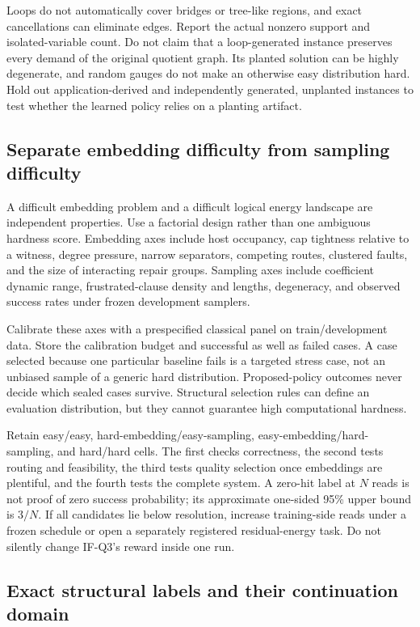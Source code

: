 \documentclass[11pt,a4paper]{article}
\theoremstyle{definition}\newtheorem{definition}[proposition]{Definition}
\begin{document}
Loops do not automatically cover bridges or tree-like regions, and exact cancellations can eliminate edges. Report the actual nonzero support and isolated-variable count. Do not claim that a loop-generated instance preserves every demand of the original quotient graph. Its planted solution can be highly degenerate, and random gauges do not make an otherwise easy distribution hard. Hold out application-derived and independently generated, unplanted instances to test whether the learned policy relies on a planting artifact.

\subsection{Separate embedding difficulty from sampling difficulty}
\label{data:hardness}

A difficult embedding problem and a difficult logical energy landscape are independent properties. Use a factorial design rather than one ambiguous hardness score. Embedding axes include host occupancy, cap tightness relative to a witness, degree pressure, narrow separators, competing routes, clustered faults, and the size of interacting repair groups. Sampling axes include coefficient dynamic range, frustrated-clause density and lengths, degeneracy, and observed success rates under frozen development samplers.

Calibrate these axes with a prespecified classical panel on train/development data. Store the calibration budget and successful as well as failed cases. A case selected because one particular baseline fails is a targeted stress case, not an unbiased sample of a generic hard distribution. Proposed-policy outcomes never decide which sealed cases survive. Structural selection rules can define an evaluation distribution, but they cannot guarantee high computational hardness.

Retain easy/easy, hard-embedding/easy-sampling, easy-embedding/hard-sampling, and hard/hard cells. The first checks correctness, the second tests routing and feasibility, the third tests quality selection once embeddings are plentiful, and the fourth tests the complete system. A zero-hit label at $N$ reads is not proof of zero success probability; its approximate one-sided 95\% upper bound is $3/N$. If all candidates lie below resolution, increase training-side reads under a frozen schedule or open a separately registered residual-energy task. Do not silently change IF-Q3's reward inside one run.

\subsection{Exact structural labels and their continuation domain}
\label{data:structural}
\end{document}
